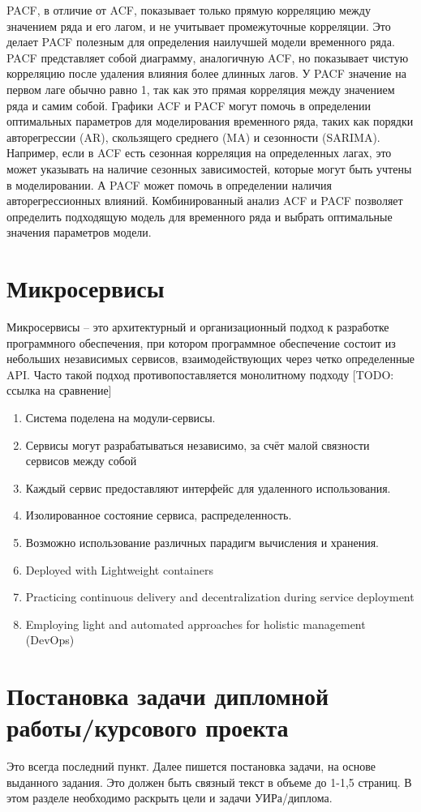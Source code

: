 PACF, в отличие от ACF, показывает только прямую корреляцию между значением ряда и его лагом, и не учитывает промежуточные корреляции. Это делает PACF полезным для определения наилучшей модели временного ряда. PACF представляет собой диаграмму, аналогичную ACF, но показывает чистую корреляцию после удаления влияния более длинных лагов. У PACF значение на первом лаге обычно равно 1, так как это прямая корреляция между значением ряда и самим собой.
Графики ACF и PACF могут помочь в определении оптимальных параметров для моделирования временного ряда, таких как порядки авторегрессии (AR), скользящего среднего (MA) и сезонности (SARIMA). Например, если в ACF есть сезонная корреляция на определенных лагах, это может указывать на наличие сезонных зависимостей, которые могут быть учтены в моделировании. А PACF может помочь в определении наличия авторегрессионных влияний.
Комбинированный анализ ACF и PACF позволяет определить подходящую модель для временного ряда и выбрать оптимальные значения параметров модели.

\section{Микросервисы}
Микросервисы – это архитектурный и организационный подход к разработке программного обеспечения, при котором программное обеспечение состоит из небольших независимых сервисов, взаимодействующих через четко
определенные API. Часто такой подход противопоставляется монолитному подходу [TODO: ссылка на сравнение]

\begin{enumerate}
	\item Система поделена на модули-сервисы.
	\item Сервисы могут разрабатываться независимо, за счёт малой связности сервисов между собой
	\item Каждый сервис предоставляют интерфейс для удаленного использования.
	\item Изолированное состояние сервиса, распределенность.
	\item Возможно использование различных парадигм вычисления и хранения.
	\item Deployed with Lightweight containers
	\item Practicing continuous delivery and decentralization during service deployment
	\item Employing light and automated approaches for holistic management (DevOps)
\end{enumerate}


\section{Постановка задачи дипломной работы/курсового проекта}

Это всегда последний пункт. Далее пишется постановка задачи, на основе выданного задания. Это должен быть связный текст в объеме до 1-1,5 страниц. В этом разделе необходимо раскрыть цели и задачи УИРа/диплома. 


